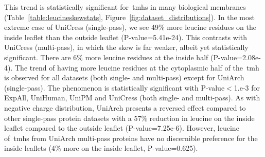 This trend is statistically significant for~\gls{tmh}s in many biological membranes (Table~\ref{table:leucineskewstats}, Figure~\ref{fig:dataset_distributions}).
In the most extreme case of UniCress (single-pass), we see 49\% more leucine residues on the inside leaflet than the outside leaflet (P\--value=5.41e-24).
This contrasts with UniCress (multi-pass), in which the skew is far weaker, albeit yet statistically significant.
There are 6\% more leucine residues at the inside half (P\--value=2.08e-4).
The trend of having more leucine residues at the cytoplasmic half of the~\gls{tmh} is observed for all datasets (both single- and multi-pass) except for UniArch (single-pass).
The phenomenon is statistically significant with P\--value$<$1.e-3 for ExpAll, UniHuman, UniPM and UniCress (both single- and multi-pass).
As with negative charge distribution, UniArch presents a reversed effect compared to other single-pass protein datasets with a 57\% reduction in leucine on the inside leaflet compared to the outside leaflet (P\--value=7.25e-6).
However, leucine of~\gls{tmh}s from UniArch multi-pass proteins have no discernible preference for the inside leaflets (4\% more on the inside leaflet, P\--value=0.625).

